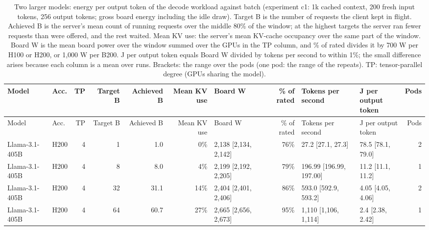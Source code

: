 \begin{landscape}
\begingroup
\scriptsize
\setlength{\tabcolsep}{3pt}
\begin{longtable}{llrrrrlrllr}
\caption{Two larger models: energy per output token of the decode workload against batch (experiment c1: 1k cached context, 200 fresh input tokens, 256 output tokens; gross board energy including the idle draw). Target B is the number of requests the client kept in flight. Achieved B is the server's mean count of running requests over the middle 80\% of the window; at the highest targets the server ran fewer requests than were offered, and the rest waited. Mean KV use: the server's mean KV-cache occupancy over the same part of the window. Board W is the mean board power over the window summed over the GPUs in the TP column, and \% of rated divides it by 700 W per H100 or H200, or 1,000 W per B200. J per output token equals Board W divided by tokens per second to within 1\%; the small difference arises because each column is a mean over runs. Brackets: the range over the pods (one pod: the range of the repeats). TP: tensor-parallel degree (GPUs sharing the model).}\label{tab:size_decode_batch}\\
\toprule
Model & Acc. & TP & Target B & Achieved B & Mean KV use & Board W & \% of rated & \makecell[l]{Tokens per\\second} & \makecell[l]{J per output\\token} & Pods \\
\midrule
\endfirsthead
\toprule
Model & Acc. & TP & Target B & Achieved B & Mean KV use & Board W & \% of rated & \makecell[l]{Tokens per\\second} & \makecell[l]{J per output\\token} & Pods \\
\midrule
\endhead
\bottomrule
\endfoot
Llama-3.1-405B & H200 & 4 & 1 & 1.0 & 0\% & 2,138 {[}2,134, 2,142{]} & 76\% & 27.2 {[}27.1, 27.3{]} & 78.5 {[}78.1, 79.0{]} & 2 \\
Llama-3.1-405B & H200 & 4 & 8 & 8.0 & 4\% & 2,199 {[}2,192, 2,205{]} & 79\% & 196.99 {[}196.99, 197.00{]} & 11.2 {[}11.1, 11.2{]} & 1 \\
Llama-3.1-405B & H200 & 4 & 32 & 31.1 & 14\% & 2,404 {[}2,401, 2,406{]} & 86\% & 593.0 {[}592.9, 593.2{]} & 4.05 {[}4.05, 4.06{]} & 2 \\
Llama-3.1-405B & H200 & 4 & 64 & 60.7 & 27\% & 2,665 {[}2,656, 2,673{]} & 95\% & 1,110 {[}1,106, 1,114{]} & 2.4 {[}2.38, 2.42{]} & 1 \\

\end{longtable}
\end{landscape}
